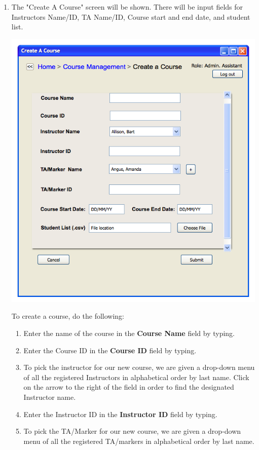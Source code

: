 \documentclass{article}
\begin{document}
\begin{enumerate}
   \label{courseManage}
 \item The "Create A Course" screen will be shown. There will be input fields
   for Instructors Name/ID, TA Name/ID, Course start and end date, and student list.
   \centerline{\includegraphics[scale=0.55]{../images/UIMockups/pngs/createACourse}}
   \label{createCourse}
   To create a course, do the following:
   \begin{enumerate}
     \item Enter the name of the course in the \textbf{Course Name} field by typing.
     \item Enter the Course ID in the \textbf{Course ID} field by typing.
     \item To pick the instructor for our new course, we are given a drop-down
       menu of all the registered Instructors in alphabetical order by last
       name. Click on the arrow to the right of the field in order to find
       the designated Instructor name.
     \item Enter the Instructor ID in the \textbf{Instructor ID} field by typing.
     \item To pick the TA/Marker for our new course, we are given a drop-down
       menu of all the registered TA/markers in alphabetical order by last name.

\end{enumerate}
\end{enumerate}
\end{document}
